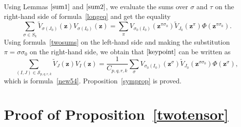\documentclass[pdftex]{sigma}
\numberwithin{equation}{section}
\begin{document}
Using Lemmas $\ref{sum1}$ and $\ref{sum2}$, we evaluate the sums over $\sigma$ and $\tau$ on the right-hand side of formula~\eqref{longeq} and get the equality
\begin{equation}\label{keypoint}
\sum_{\sigma\in S_k} \widetilde{V}_{\sigma(J_0)}(\boldsymbol{z}) V_{\sigma(I_0)}(\boldsymbol{z} )=\sum_{\pi} V_{\sigma_0(I_0)}(\boldsymbol{z}^{\pi\sigma_0})\widetilde{V}_{J_0}(\boldsymbol{z}^{\pi})\Phi(\boldsymbol{z}^{\pi\sigma_0}).
\end{equation}
Using formula~\eqref{twosums} on the left-hand side and making the substitution $\pi=\sigma\sigma_0$ on the right-hand side, we obtain that $\eqref{keypoint}$ can be written as
\begin{equation*}
\sum_{(I,J)\in \mathcal{S}_{p,q,r,k}}\widetilde{V}_J( \boldsymbol{z}) V_I(\boldsymbol{z})=\frac{1}{C_{p,q,r,k}} \sum_{\sigma} V_{\sigma_0(I_0)}(\boldsymbol{z}^{\sigma})\widetilde{V}_{J_0}(\boldsymbol{z}^{\sigma\sigma_0})\Phi(\boldsymbol{z}^{ \sigma}),
\end{equation*}
which is formula~\eqref{new54}. Proposition~\ref{symprop} is proved.

\appendix

\section{Proof of Proposition~\ref{twotensor}}\label{appendixA}
\end{document}
